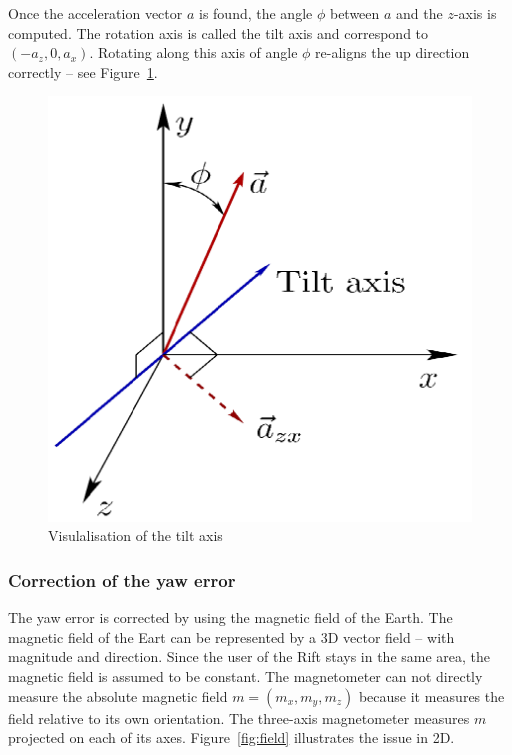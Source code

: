 \documentclass[12pt, twoside]{article}
\begin{document}
Once the acceleration vector $a$ is found, the angle $\phi$ between $a$ and the $z$-axis is computed. The rotation axis is called the tilt axis and correspond to $(-a_z, 0, a_x)$. Rotating along this axis of angle $\phi$ re-aligns the up direction correctly -- see Figure~\ref{fig:tilt}.

\begin{figure}[h]
  \centering
  \includegraphics[scale=0.2]{tilt.png}
  \caption{\label{fig:tilt} Visulalisation of the tilt axis\protect\footnotemark}
\end{figure}

\subsubsection{Correction of the yaw error}
The yaw error is corrected by using the magnetic field of the Earth. The magnetic field of the Eart can be represented by a 3D vector field -- with magnitude and direction. Since the user of the Rift stays in the same area, the magnetic field is assumed to be constant. The magnetometer can not directly measure the absolute magnetic field $m = (m_x, m_y, m_z)$ because it measures the field relative to its own orientation. The three-axis magnetometer measures $m$ projected on each of its axes. Figure~\ref{fig:field} illustrates the issue in 2D.
\end{document}
